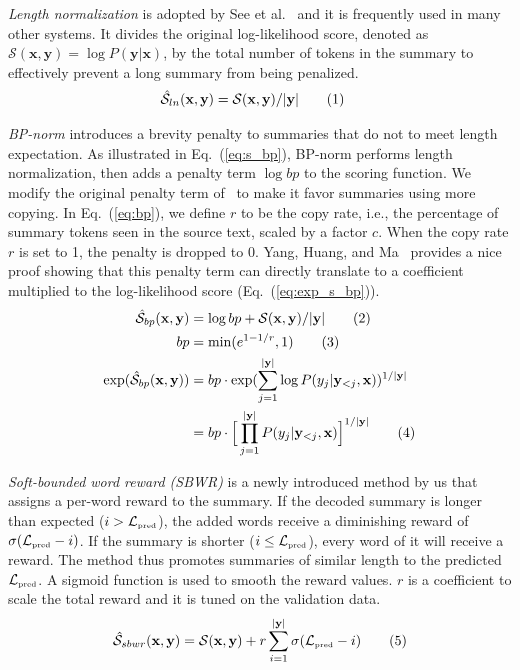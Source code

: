 \documentclass[letterpaper]{article} %
\newcommand\numberthis{\addtocounter{equation}{1}\tag{\theequation}}
\begin{document}
\textit{Length normalization} is adopted by See et al.~ and it is frequently used in many other systems. 
It divides the original log-likelihood score, denoted as $\mathcal{S}(\mathbf{x}, \mathbf{y}) = \log P(\mathbf{y}|\mathbf{x})$, by the total number of tokens in the summary to effectively prevent a long summary from being penalized.
\begin{align*}
\hat{\mathcal{S}}_{ln}(\mathbf{x},\mathbf{y}) &= \mathcal{S}(\mathbf{x},\mathbf{y})/|\mathbf{y}|
\numberthis\label{eq:s_bp}
\end{align*}

\textit{BP-norm} introduces a brevity penalty to summaries that do not to meet length expectation.
As illustrated in Eq.~(\ref{eq:s_bp}), BP-norm performs length normalization, then adds a penalty term $\log bp$ to the scoring function.
We modify the original penalty term of~\cite{yang-etal-2018-breaking} to make it favor summaries using more copying.
In Eq.~(\ref{eq:bp}), we define $r$ to be the copy rate, i.e., the percentage of summary tokens seen in the source text, scaled by a factor $c$.
When the copy rate $r$ is set to 1, the penalty is dropped to 0. 
Yang, Huang, and Ma~ provides a nice proof showing that this penalty term can directly translate to a coefficient multiplied to the log-likelihood score (Eq.~(\ref{eq:exp_s_bp})).
\begin{align*}
\hat{\mathcal{S}}_{bp}(\mathbf{x},\mathbf{y}) &= \log bp + \mathcal{S}(\mathbf{x},\mathbf{y})/|\mathbf{y}|
\numberthis\label{eq:s_bp}\\
bp &= \min(e^{1-1/r}, 1)
\numberthis\label{eq:bp}\\
\exp (\hat{\mathcal{S}}_{bp}(\mathbf{x},\mathbf{y})) &= bp \cdot \exp(\sum_{j=1}^{|\mathbf{y}|}\log P(y_j|\mathbf{y}_{<j}, \mathbf{x}))^{1/|\mathbf{y}|}\\
&= bp \cdot \Big[\prod_{j=1}^{|\mathbf{y}|} P(y_j|\mathbf{y}_{<j}, \mathbf{x})\Big]^{1/|\mathbf{y}|}
\numberthis\label{eq:exp_s_bp}
\end{align*}

\textit{Soft-bounded word reward (SBWR)} is a newly introduced method by us that assigns a per-word reward to the summary.
If the decoded summary is longer than expected ($i>\mathcal{L}_{\mbox{\tiny pred}}$),
the added words receive a diminishing reward of $\sigma(\mathcal{L}_{\mbox{\tiny pred}} - i)$. 
If the summary is shorter ($i \leq \mathcal{L}_{\mbox{\tiny pred}}$), every word of it will receive a reward.
The method thus promotes summaries of similar length to the predicted $\mathcal{L}_{\mbox{\tiny pred}}$.
A sigmoid function is used to smooth the reward values. $r$ is a coefficient to scale the total reward and it is tuned on the validation data.
\begin{align*}
\hat{\mathcal{S}}_{sbwr}(\mathbf{x},\mathbf{y}) = \mathcal{S}(\mathbf{x},\mathbf{y}) + r  \sum_{i=1}^{|\mathbf{y}|} \sigma(\mathcal{L}_{\mbox{\tiny pred}} - i)
\numberthis\label{eq:smooth-length-bounded-reward}
\end{align*}
\end{document}
